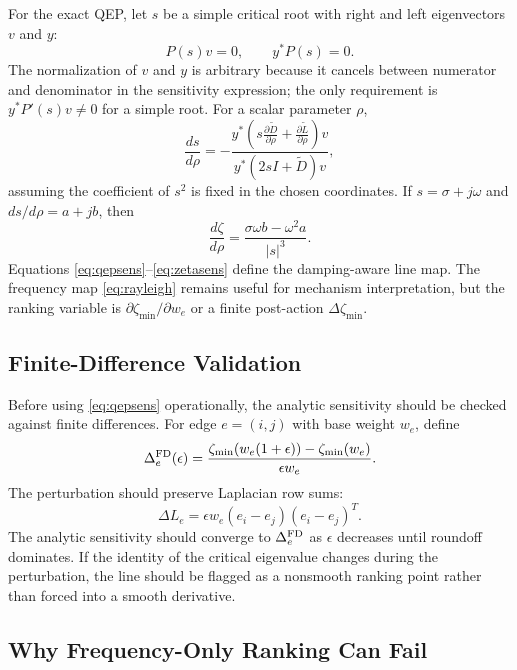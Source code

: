 \documentclass[journal]{IEEEtran}
\newcommand{\Lt}{\widetilde L}
\newcommand{\Dt}{\widetilde D}
\begin{document}
For the exact QEP, let $s$ be a simple critical root with right and left eigenvectors $v$ and $y$:
\begin{equation}
P(s)v=0,\qquad y^\ast P(s)=0.
\end{equation}
The normalization of $v$ and $y$ is arbitrary because it cancels between numerator and denominator in the sensitivity expression; the only requirement is $y^\ast P'(s)v\neq0$ for a simple root.
For a scalar parameter $\rho$,
\begin{equation}
\frac{ds}{d\rho}=
-\frac{y^\ast\left(s\frac{\partial \Dt}{\partial\rho}+\frac{\partial \Lt}{\partial\rho}\right)v}
{y^\ast(2sI+\Dt)v},
\label{eq:qepsens}
\end{equation}
assuming the coefficient of $s^2$ is fixed in the chosen coordinates. If $s=\sigma+j\omega$ and $ds/d\rho=a+jb$, then
\begin{equation}
\frac{d\zeta}{d\rho}=
\frac{\sigma\omega b-\omega^2a}{|s|^3}.
\label{eq:zetasens}
\end{equation}
Equations \eqref{eq:qepsens}--\eqref{eq:zetasens} define the damping-aware line map. The frequency map \eqref{eq:rayleigh} remains useful for mechanism interpretation, but the ranking variable is $\partial\zeta_{\min}/\partial w_e$ or a finite post-action $\Delta\zeta_{\min}$.

\subsection{Finite-Difference Validation}

Before using \eqref{eq:qepsens} operationally, the analytic sensitivity should be checked against finite differences. For edge $e=(i,j)$ with base weight $w_e$, define
\begin{equation}
\Delta_e^{\rm FD}(\epsilon)=
\frac{\zeta_{\min}(w_e(1+\epsilon))-\zeta_{\min}(w_e)}{\epsilon w_e}.
\end{equation}
The perturbation should preserve Laplacian row sums:
\begin{equation}
\Delta L_e=\epsilon w_e(e_i-e_j)(e_i-e_j)^T.
\end{equation}
The analytic sensitivity should converge to $\Delta_e^{\rm FD}$ as $\epsilon$ decreases until roundoff dominates. If the identity of the critical eigenvalue changes during the perturbation, the line should be flagged as a nonsmooth ranking point rather than forced into a smooth derivative.

\subsection{Why Frequency-Only Ranking Can Fail}
\end{document}
